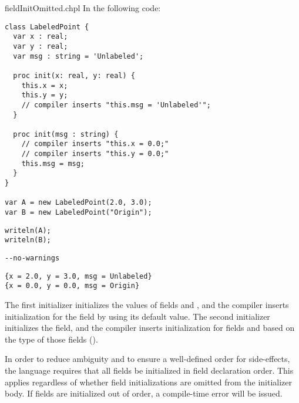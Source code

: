 \begin{chapelexample}{fieldInitOmitted.chpl}
In the following code:
\begin{chapel}
\begin{verbatim}
class LabeledPoint {
  var x : real;
  var y : real;
  var msg : string = 'Unlabeled';

  proc init(x: real, y: real) {
    this.x = x;
    this.y = y;
    // compiler inserts "this.msg = 'Unlabeled'";
  }

  proc init(msg : string) {
    // compiler inserts "this.x = 0.0;"
    // compiler inserts "this.y = 0.0;"
    this.msg = msg;
  }
}

var A = new LabeledPoint(2.0, 3.0);
var B = new LabeledPoint("Origin");
\end{verbatim}
\end{chapel}
\begin{chapelpost}
\begin{verbatim}
writeln(A);
writeln(B);
\end{verbatim}
\end{chapelpost}
\begin{chapelcompopts}
\begin{verbatim}
--no-warnings
\end{verbatim}
\end{chapelcompopts}
\begin{chapeloutput}
\begin{verbatim}
{x = 2.0, y = 3.0, msg = Unlabeled}
{x = 0.0, y = 0.0, msg = Origin}
\end{verbatim}
\end{chapeloutput}
The first initializer initializes the values of fields  and ,
and the compiler inserts initialization for the  field by using
its default value. The second initializer initializes the  field,
and the compiler inserts initialization for fields  and 
based on the type of those fields ().
\end{chapelexample}

In order to reduce ambiguity and to ensure a well-defined order for
side-effects, the language requires that all fields be initialized in field
declaration order. This applies regardless of whether field initializations are
omitted from the initializer body. If fields are initialized out of order, a
compile-time error will be issued.


